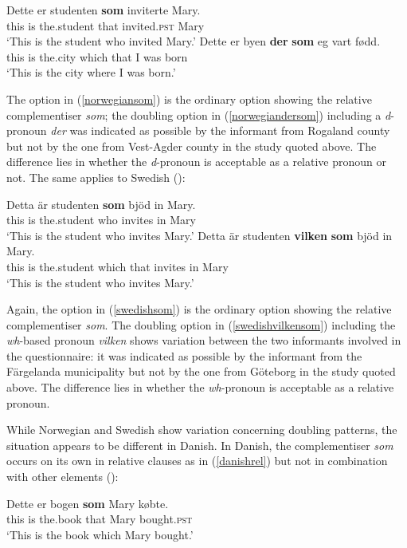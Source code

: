 \ea
\ea \gll Dette er studenten \textbf{som} inviterte	Mary. \label{norwegiansom}\\
this is	the.student	that invited.\textsc{pst}	Mary\\
\glt `This is the student who invited Mary.'
\ex \gll Dette	er byen	\textbf{der} \textbf{som}	eg vart	fødd. \label{norwegiandersom}\\
this	is	the.city	which	that	I	was	born\\
\glt `This is the city where I was born.'
\z
\z

The option in (\ref{norwegiansom}) is the ordinary option showing the relative complementiser \textit{som}; the doubling option in (\ref{norwegiandersom}) including a \textit{d}-pronoun \textit{der} was indicated as possible by the informant from Rogaland county but not by the one from Vest-Agder county in the study quoted above. The difference lies in whether the \textit{d}-pronoun is acceptable as a relative pronoun or not. The same applies to Swedish (\citealt[246--247]{bacskaiatkaribaudisch2018}):

\ea
\ea \gll Detta	är studenten \textbf{som} bjöd in Mary. \label{swedishsom}\\
this is	the.student	who	invites	in Mary\\
\glt `This is the student who invites Mary.'
\ex \gll Detta	är studenten \textbf{vilken} \textbf{som} bjöd in	Mary. \label{swedishvilkensom}\\
this is	the.student	which that invites in	Mary\\
\glt `This is the student who invites Mary.'
\z
\z

Again, the option in (\ref{swedishsom}) is the ordinary option showing the relative complementiser \textit{som}. The doubling option in (\ref{swedishvilkensom}) including the \textit{wh}-based pronoun \textit{vilken} shows variation between the two informants involved in the questionnaire: it was indicated as possible by the informant from the Färgelanda municipality but not by the one from Göteborg in the study quoted above. The difference lies in whether the \textit{wh}-pronoun is acceptable as a relative pronoun.

While Norwegian and Swedish show variation concerning doubling patterns, the situation appears to be different in Danish. In Danish, the complementiser \textit{som} occurs on its own in relative clauses as in (\ref{danishrel}) but not in combination with other elements (\citealt[89--91]{bacskaiatkaribaudisch2018}):

\ea \gll Dette er bogen \textbf{som} Mary købte. \label{danishrel}\\
this is the.book that Mary bought.\textsc{pst}\\
\glt `This is the book which Mary bought.'
\z

